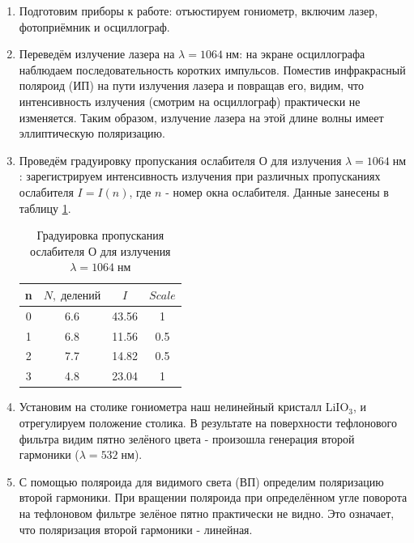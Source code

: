 \documentclass[a4paper,12pt]{article} %
\begin{document}
\begin{enumerate}
\item Подготовим приборы к работе: отъюстируем гониометр, включим лазер, фотоприёмник и осциллограф.

\item Переведём излучение лазера на $\lambda = 1064 \; нм$: на экране осциллографа наблюдаем последовательность коротких импульсов. Поместив инфракрасный поляроид (ИП) на пути излучения лазера и повращав его, видим, что интенсивность излучения (смотрим на осциллограф) практически не изменяется. Таким образом, излучение лазера на этой длине волны имеет эллиптическую поляризацию. 

\item Проведём градуировку пропускания ослабителя О для излучения $\lambda = 1064 \; нм$: зарегистрируем интенсивность излучения при различных пропусканиях ослабителя $I = I(n)$, где $n$ - номер окна ослабителя. Данные занесены в таблицу \ref{I_532_1064}.


\begin{table}[htbp]
\caption{Градуировка пропускания ослабителя О для излучения $\lambda = 1064 \; нм$}
\begin{center}
\begin{tabular}{|c|c|c|c|}
\hline
n & $N, \; делений$ & $I$ & $Scale$\\ \hline
0 & 6.6 & 43.56 & 1\\ \hline
1 & 6.8 & 11.56 & 0.5\\ \hline
2 & 7.7 & 14.82 & 0.5\\ \hline
3 & 4.8 & 23.04 & 1\\ \hline
\end{tabular}
\end{center}
\label{I_532_1064}
\end{table}

\item Установим на столике гониометра наш нелинейный кристалл LiIO$_3$, и отрегулируем положение столика. В результате на поверхности тефлонового фильтра видим пятно зелёного цвета - произошла генерация второй гармоники ($\lambda = 532 \; нм$).

\item С помощью поляроида для видимого света (ВП) определим поляризацию второй гармоники. При вращении поляроида при определённом угле поворота на тефлоновом фильтре зелёное пятно практически не видно. Это означает, что поляризация второй гармоники  - линейная.


\end{enumerate}
\end{document}
